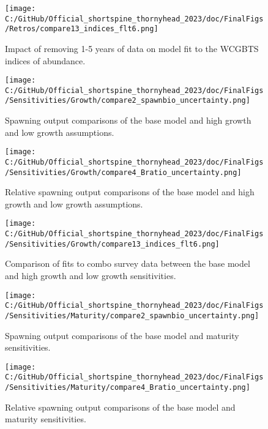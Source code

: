 \documentclass[11pt,
  english,
  letterpaper,
]{article}
\begin{document}
\begin{figure}
\centering
\texttt{[image: C:/GitHub/Official\_shortspine\_thornyhead\_2023/doc/FinalFigs/Retros/compare13\_indices\_flt6.png]}
\caption{Impact of removing 1-5 years of data on model fit to the WCGBTS indices of abundance.\label{fig:retros_indices}}
\end{figure}

\begin{figure}
\centering
\texttt{[image: C:/GitHub/Official\_shortspine\_thornyhead\_2023/doc/FinalFigs/Sensitivities/Growth/compare2\_spawnbio\_uncertainty.png]}
\caption{Spawning output comparisons of the base model and high growth and low growth assumptions.\label{fig:growth_sensitiv_spawning}}
\end{figure}

\begin{figure}
\centering
\texttt{[image: C:/GitHub/Official\_shortspine\_thornyhead\_2023/doc/FinalFigs/Sensitivities/Growth/compare4\_Bratio\_uncertainty.png]}
\caption{Relative spawning output comparisons of the base model and high growth and low growth assumptions.\label{fig:growth_sensitiv_mngmt}}
\end{figure}

\begin{figure}
\centering
\texttt{[image: C:/GitHub/Official\_shortspine\_thornyhead\_2023/doc/FinalFigs/Sensitivities/Growth/compare13\_indices\_flt6.png]}
\caption{Comparison of fits to combo survey data between the base model and high growth and low growth sensitivities.\label{fig:growth_sensitiv_indx}}
\end{figure}

\begin{figure}
\centering
\texttt{[image: C:/GitHub/Official\_shortspine\_thornyhead\_2023/doc/FinalFigs/Sensitivities/Maturity/compare2\_spawnbio\_uncertainty.png]}
\caption{Spawning output comparisons of the base model and maturity sensitivities.\label{fig:mat_sensitiv_spawning}}
\end{figure}

\begin{figure}
\centering
\texttt{[image: C:/GitHub/Official\_shortspine\_thornyhead\_2023/doc/FinalFigs/Sensitivities/Maturity/compare4\_Bratio\_uncertainty.png]}
\caption{Relative spawning output comparisons of the base model and maturity sensitivities.\label{fig:mat_sensitiv_mngmt}}
\end{figure}
\end{document}
